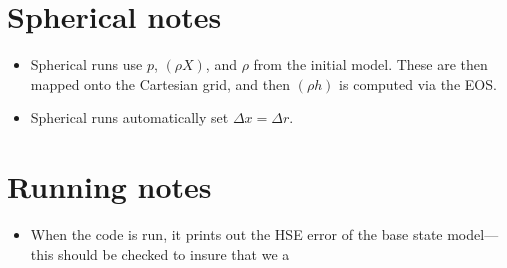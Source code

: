 \documentclass[11pt]{article}
\begin{document}
\section{Spherical notes}
\begin{itemize}
\item Spherical runs use $p$, $(\rho X)$, and $\rho$ from the initial
model.  These are then mapped onto the Cartesian grid, and then
$(\rho h)$ is computed via the EOS.
\item Spherical runs automatically set $\Delta x = \Delta r$.
\end{itemize}
\section{Running notes}
\begin{itemize}
\item When the code is run, it prints out the HSE error of the base
state model---this should be checked to insure that we a
\end{itemize}
\end{document}
